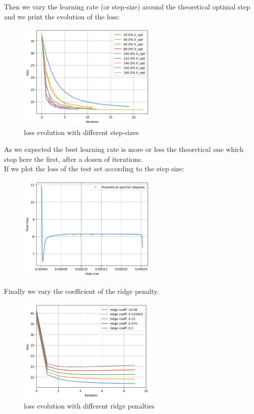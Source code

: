 \documentclass{article}
\begin{document}
    Then we vary the learning rate (or step-size) around the theoretical optimal step and we print the evolution of the loss:

     \begin{figure}[!h]
    \centering
    \includegraphics[width=0.6\textwidth]{images/loss2.png}
    \caption{loss evolution with different step-sizes}
    \label{fig:loss2}
    \end{figure}   

    As we expected the best learning rate is more or less the theoretical one which stop here the first, after a dozen of iterations.
\\
    If we plot the loss of the test set according to the step size:
\newpage
    \begin{figure}[!h]
    \centering
    \includegraphics[width=0.6\textwidth]{images/part1.png}
    \caption{}
    \label{fig:part1}
    \end{figure}   
    

    Finally we vary the coefficient of the ridge penalty. 
    
     \begin{figure}[!h]
    \centering
    \includegraphics[width=0.6\textwidth]{images/loss3.png}
    \caption{loss evolution with different ridge penalties}
    \label{fig:loss3}
    \end{figure}   
\end{document}
